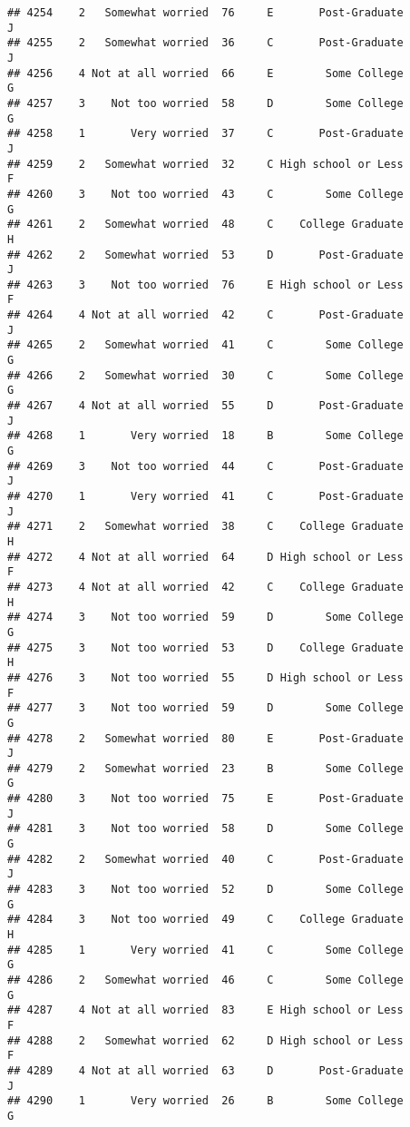 \documentclass[
]{article}
\begin{document}
\begin{verbatim}
## 4254    2   Somewhat worried  76     E       Post-Graduate         J
## 4255    2   Somewhat worried  36     C       Post-Graduate         J
## 4256    4 Not at all worried  66     E        Some College         G
## 4257    3    Not too worried  58     D        Some College         G
## 4258    1       Very worried  37     C       Post-Graduate         J
## 4259    2   Somewhat worried  32     C High school or Less         F
## 4260    3    Not too worried  43     C        Some College         G
## 4261    2   Somewhat worried  48     C    College Graduate         H
## 4262    2   Somewhat worried  53     D       Post-Graduate         J
## 4263    3    Not too worried  76     E High school or Less         F
## 4264    4 Not at all worried  42     C       Post-Graduate         J
## 4265    2   Somewhat worried  41     C        Some College         G
## 4266    2   Somewhat worried  30     C        Some College         G
## 4267    4 Not at all worried  55     D       Post-Graduate         J
## 4268    1       Very worried  18     B        Some College         G
## 4269    3    Not too worried  44     C       Post-Graduate         J
## 4270    1       Very worried  41     C       Post-Graduate         J
## 4271    2   Somewhat worried  38     C    College Graduate         H
## 4272    4 Not at all worried  64     D High school or Less         F
## 4273    4 Not at all worried  42     C    College Graduate         H
## 4274    3    Not too worried  59     D        Some College         G
## 4275    3    Not too worried  53     D    College Graduate         H
## 4276    3    Not too worried  55     D High school or Less         F
## 4277    3    Not too worried  59     D        Some College         G
## 4278    2   Somewhat worried  80     E       Post-Graduate         J
## 4279    2   Somewhat worried  23     B        Some College         G
## 4280    3    Not too worried  75     E       Post-Graduate         J
## 4281    3    Not too worried  58     D        Some College         G
## 4282    2   Somewhat worried  40     C       Post-Graduate         J
## 4283    3    Not too worried  52     D        Some College         G
## 4284    3    Not too worried  49     C    College Graduate         H
## 4285    1       Very worried  41     C        Some College         G
## 4286    2   Somewhat worried  46     C        Some College         G
## 4287    4 Not at all worried  83     E High school or Less         F
## 4288    2   Somewhat worried  62     D High school or Less         F
## 4289    4 Not at all worried  63     D       Post-Graduate         J
## 4290    1       Very worried  26     B        Some College         G

\end{verbatim}
\end{document}
